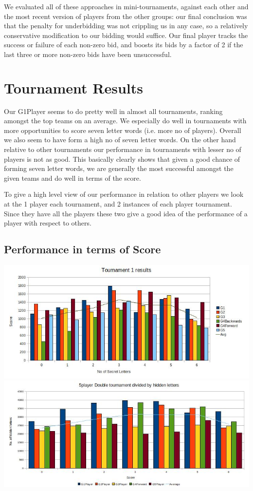 \documentclass[11pt]{article}
\begin{document}
We evaluated all of these approaches in mini-tournaments, against each other and the most recent version of players from the other groups: our final conclusion was that the penalty for underbidding was not crippling us in any case, so a relatively conservative modification to our bidding would suffice.  Our final player tracks the success or failure of each non-zero bid, and boosts its bids by a factor of 2 if the last three or more non-zero bids have been unsuccessful. %



\section{Tournament Results} %
	Our G1Player seems to do pretty well in almost all tournaments, ranking amongst the top teams on an average. We especially do well in tournaments with more opportunities to score seven letter words (i.e. more no of players). Overall we also seem to have form a high no of seven letter words. On the other hand relative to other tournaments our performance in tournaments with lesser no of players is not as good. This basically clearly shows that given a good chance of forming seven letter words, we are generally the most successful amongst the given teams and do well in terms of the score.
	
	To give a high level view of our performance in relation to other players we look at the 1 player each tournament, and 2 instances of each player tournament. Since they have all the players these two give a good idea of the performance of a player with respect to others. 
	
	\subsection{Performance in terms of Score}
	
	\includegraphics[width=1\textwidth]{T1Results}
	\includegraphics[width=1\textwidth]{T2Results}
	
\end{document}
